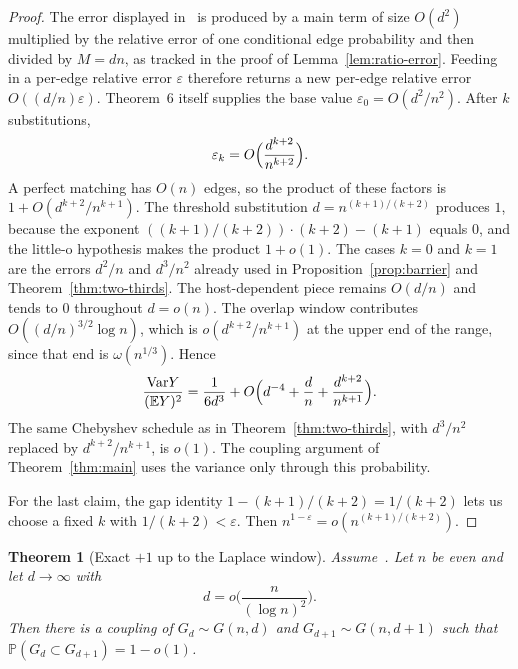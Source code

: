 \documentclass[11pt]{article}
\newtheorem{theorem}{Theorem}
\newcommand{\Gnd}{G(n,d)}
\newcommand{\EE}{\mathbb{E}}
\newcommand{\PP}{\mathbb{P}}
\newcommand{\Var}{\mathrm{Var}}
\begin{document}
\begin{proof}
The error displayed in~\cite[Theorem~6]{Gao20} is produced by a main term of size
\(O(d^2)\) multiplied by the relative error of one conditional edge probability and
then divided by \(M=dn\), as tracked in the proof of Lemma~\ref{lem:ratio-error}.
Feeding in a per-edge relative error \(\varepsilon\) therefore returns a new per-edge
relative error \(O((d/n)\varepsilon)\).
Theorem~6 itself supplies the base value \(\varepsilon_0=O(d^2/n^2)\).
After \(k\) substitutions,
\[
\varepsilon_k=O\Bigl(\frac{d^{k+2}}{n^{k+2}}\Bigr).
\]
A perfect matching has \(O(n)\) edges, so the product of these factors is
\(1+O(d^{k+2}/n^{k+1})\). The threshold substitution
\(d=n^{(k+1)/(k+2)}\) produces \(1\), because the exponent
\(((k+1)/(k+2))\cdot(k+2)-(k+1)\) equals \(0\),
and the little-o hypothesis makes the product \(1+o(1)\).
The cases \(k=0\) and \(k=1\) are the errors \(d^2/n\) and \(d^3/n^2\) already used in
Proposition~\ref{prop:barrier} and Theorem~\ref{thm:two-thirds}.
The host-dependent piece remains \(O(d/n)\) and tends to \(0\) throughout
\(d=o(n)\). The overlap window contributes \(O((d/n)^{3/2}\log n)\), which is
\(o(d^{k+2}/n^{k+1})\) at the upper end of the range, since that end is
\(\omega(n^{1/3})\).
Hence
\[
\frac{\Var Y}{(\EE Y)^2}
=
\frac1{6d^3}+O\Bigl(d^{-4}+\frac{d}{n}+\frac{d^{k+2}}{n^{k+1}}\Bigr).
\]
The same Chebyshev schedule as in Theorem~\ref{thm:two-thirds}, with \(d^3/n^2\)
replaced by \(d^{k+2}/n^{k+1}\), is \(o(1)\). The coupling argument of
Theorem~\ref{thm:main} uses the variance only through this probability.

For the last claim, the gap identity
\(1-(k+1)/(k+2)=1/(k+2)\) lets us choose a fixed \(k\) with \(1/(k+2)<\varepsilon\).
Then \(n^{1-\varepsilon}=o(n^{(k+1)/(k+2)})\).
\end{proof}

\begin{theorem}[Exact \(+1\) up to the Laplace window]
\label{thm:laplace-degree}
Assume~\cite[Theorem~6]{Gao20}. Let \(n\) be even and let \(d\to\infty\) with
\[
d=o\Biggl(\frac{n}{(\log n)^2}\Biggr).
\]
Then there is a coupling of \(G_d\sim\Gnd\) and \(G_{d+1}\sim G(n,d+1)\) such that
\(\PP(G_d\subset G_{d+1})=1-o(1)\).
\end{theorem}
\end{document}
